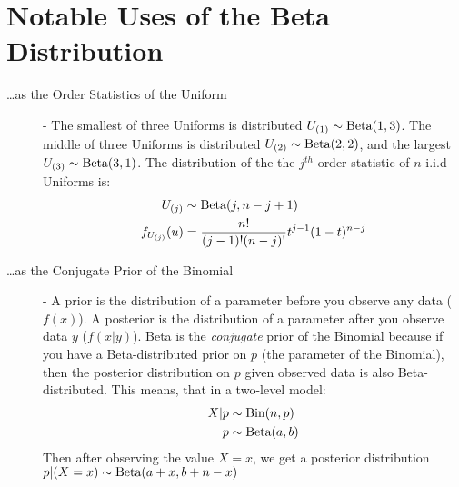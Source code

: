\documentclass[11pt]{article}
\theoremstyle{definition}
\theoremstyle{remark}
\newcommand{\Bin}{\textnormal{Bin}}
\newcommand{\Beta}{\textnormal{Beta}}
\begin{document}
\section{Notable Uses of the Beta Distribution}
\begin{description}
	\item[\dots as the Order Statistics of the Uniform] -  The smallest of three Uniforms is distributed $U_{(1)} \sim \Beta(1, 3)$. The middle of three Uniforms is distributed $U_{(2)} \sim \Beta(2, 2)$, and the largest $U_{(3)} \sim \Beta(3, 1)$. The distribution of the the $j^{th}$ order statistic of $n$ i.i.d Uniforms is:
	\begin{align*}
		U_{(j)} &\sim \Beta(j, n - j + 1) \\
		f_{U_{(j)}}(u) &= \frac{n!}{(j-1)!(n-j)!}t^{j-1}(1-t)^{n-j}
	\end{align*}
	
	
	\item[\dots as the Conjugate Prior of the Binomial] - A prior is the distribution of a parameter before you observe any data ($f(x)$). A posterior is the distribution of a parameter after you observe data $y$ ($f(x|y)$). Beta is the \emph{conjugate} prior of the Binomial because if you have a Beta-distributed prior on $p$ (the parameter of the Binomial), then the posterior distribution on $p$ given observed data is also Beta-distributed. This means, that in a two-level model:
	\begin{align*}
		X|p &\sim \Bin(n, p) \\
		p &\sim \Beta(a, b)
	\end{align*}
Then after observing the value $X = x$, we get a posterior distribution $p|(X=x) \sim \Beta(a + x, b + n - x)$
\end{description}


\end{document}
